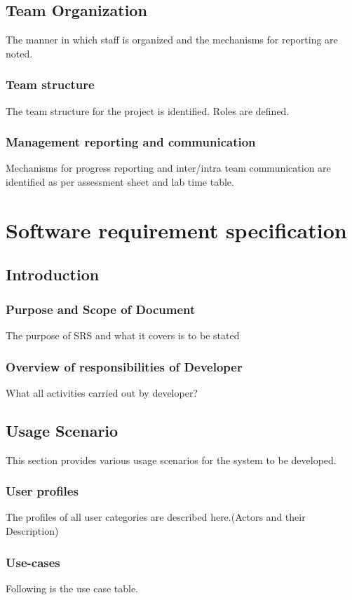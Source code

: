 \documentclass[oneside,a4paper,12pt]{report}
\begin{document}
\section{Team Organization}
The manner in which staff is organized and the mechanisms for reporting are noted.
\subsection{Team structure}
The team structure for the project is identified. Roles are defined.

\subsection{Management reporting and communication}
Mechanisms for progress reporting and inter/intra team communication are identified as per assessment sheet and lab time table.

\chapter{Software requirement specification }

\section{Introduction}
\subsection{Purpose and Scope of Document}
The purpose of SRS and what it covers is to be stated

\subsection{Overview of responsibilities of Developer}
What all activities carried out by developer?

\section{Usage Scenario}
This section provides various usage scenarios for the system to be developed.
 \subsection{User profiles}
The profiles of all user categories are described here.(Actors and their Description)

\subsection{Use-cases}
Following is the use case table.
\end{document}

